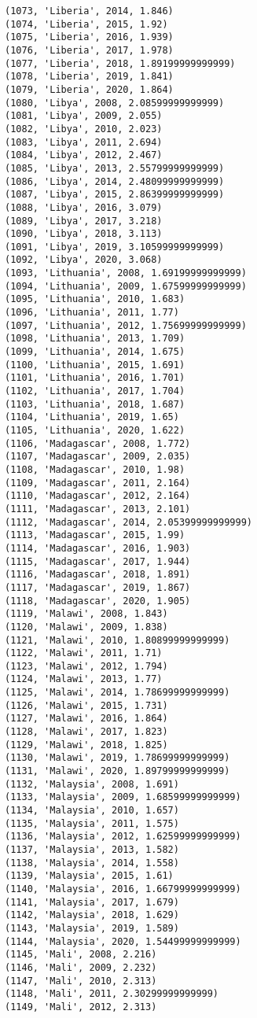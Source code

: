 \documentclass[11pt]{article}
\begin{document}
\begin{Verbatim}[commandchars=\\\{\}]
(1073, 'Liberia', 2014, 1.846)
(1074, 'Liberia', 2015, 1.92)
(1075, 'Liberia', 2016, 1.939)
(1076, 'Liberia', 2017, 1.978)
(1077, 'Liberia', 2018, 1.89199999999999)
(1078, 'Liberia', 2019, 1.841)
(1079, 'Liberia', 2020, 1.864)
(1080, 'Libya', 2008, 2.08599999999999)
(1081, 'Libya', 2009, 2.055)
(1082, 'Libya', 2010, 2.023)
(1083, 'Libya', 2011, 2.694)
(1084, 'Libya', 2012, 2.467)
(1085, 'Libya', 2013, 2.55799999999999)
(1086, 'Libya', 2014, 2.48099999999999)
(1087, 'Libya', 2015, 2.86399999999999)
(1088, 'Libya', 2016, 3.079)
(1089, 'Libya', 2017, 3.218)
(1090, 'Libya', 2018, 3.113)
(1091, 'Libya', 2019, 3.10599999999999)
(1092, 'Libya', 2020, 3.068)
(1093, 'Lithuania', 2008, 1.69199999999999)
(1094, 'Lithuania', 2009, 1.67599999999999)
(1095, 'Lithuania', 2010, 1.683)
(1096, 'Lithuania', 2011, 1.77)
(1097, 'Lithuania', 2012, 1.75699999999999)
(1098, 'Lithuania', 2013, 1.709)
(1099, 'Lithuania', 2014, 1.675)
(1100, 'Lithuania', 2015, 1.691)
(1101, 'Lithuania', 2016, 1.701)
(1102, 'Lithuania', 2017, 1.704)
(1103, 'Lithuania', 2018, 1.687)
(1104, 'Lithuania', 2019, 1.65)
(1105, 'Lithuania', 2020, 1.622)
(1106, 'Madagascar', 2008, 1.772)
(1107, 'Madagascar', 2009, 2.035)
(1108, 'Madagascar', 2010, 1.98)
(1109, 'Madagascar', 2011, 2.164)
(1110, 'Madagascar', 2012, 2.164)
(1111, 'Madagascar', 2013, 2.101)
(1112, 'Madagascar', 2014, 2.05399999999999)
(1113, 'Madagascar', 2015, 1.99)
(1114, 'Madagascar', 2016, 1.903)
(1115, 'Madagascar', 2017, 1.944)
(1116, 'Madagascar', 2018, 1.891)
(1117, 'Madagascar', 2019, 1.867)
(1118, 'Madagascar', 2020, 1.905)
(1119, 'Malawi', 2008, 1.843)
(1120, 'Malawi', 2009, 1.838)
(1121, 'Malawi', 2010, 1.80899999999999)
(1122, 'Malawi', 2011, 1.71)
(1123, 'Malawi', 2012, 1.794)
(1124, 'Malawi', 2013, 1.77)
(1125, 'Malawi', 2014, 1.78699999999999)
(1126, 'Malawi', 2015, 1.731)
(1127, 'Malawi', 2016, 1.864)
(1128, 'Malawi', 2017, 1.823)
(1129, 'Malawi', 2018, 1.825)
(1130, 'Malawi', 2019, 1.78699999999999)
(1131, 'Malawi', 2020, 1.89799999999999)
(1132, 'Malaysia', 2008, 1.691)
(1133, 'Malaysia', 2009, 1.68599999999999)
(1134, 'Malaysia', 2010, 1.657)
(1135, 'Malaysia', 2011, 1.575)
(1136, 'Malaysia', 2012, 1.62599999999999)
(1137, 'Malaysia', 2013, 1.582)
(1138, 'Malaysia', 2014, 1.558)
(1139, 'Malaysia', 2015, 1.61)
(1140, 'Malaysia', 2016, 1.66799999999999)
(1141, 'Malaysia', 2017, 1.679)
(1142, 'Malaysia', 2018, 1.629)
(1143, 'Malaysia', 2019, 1.589)
(1144, 'Malaysia', 2020, 1.54499999999999)
(1145, 'Mali', 2008, 2.216)
(1146, 'Mali', 2009, 2.232)
(1147, 'Mali', 2010, 2.313)
(1148, 'Mali', 2011, 2.30299999999999)
(1149, 'Mali', 2012, 2.313)

\end{Verbatim}
\end{document}
